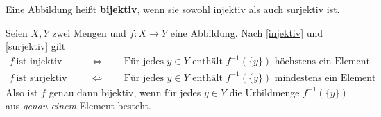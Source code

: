 \begin{de} \label{bijektiv}
	Eine Abbildung heißt \textbf{bijektiv}, wenn sie sowohl injektiv als auch surjektiv ist.
\end{de}



\begin{bem}
 Seien $X,Y$ zwei Mengen und $f:X\to Y$ eine Abbildung. Nach \cref{injektiv} und \cref{surjektiv} gilt
 \begin{align*}
  f\ \text{ist injektiv}\qquad &\Leftrightarrow\qquad \text{Für jedes $y\in Y$ enthält $f^{-1}(\{y\})$ höchstens ein Element} \\
    f\ \text{ist surjektiv}\qquad &\Leftrightarrow\qquad \text{Für jedes $y\in Y$ enthält $f^{-1}(\{y\})$ mindestens ein Element}
 \end{align*}
Also ist $f$ genau dann bijektiv, wenn für jedes $y\in Y$ die Urbildmenge $f^{-1}(\{y\})$ aus \emph{genau einem} Element besteht.
\end{bem}



